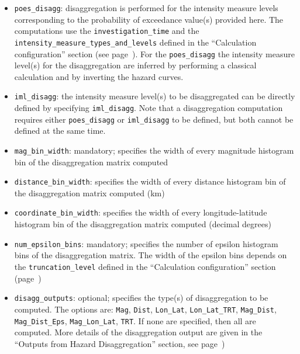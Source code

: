\begin{itemize}

    \item \Verb+poes_disagg+: disaggregation is performed for the intensity
    measure levels corresponding to the probability of exceedance value(s) provided
    here. The computations use the \texttt{investigation\_time} and the
    \texttt{intensity\_measure\_types\_and\_levels} defined in the
    ``Calculation configuration'' section   (see page~\pageref{sec:calculation_configuration}).
    For the \texttt{poes\_disagg} the intensity measure level(s) for the disaggregation are
    inferred by performing a classical calculation and by inverting the hazard curves.

    \item \Verb+iml_disagg+: the intensity measure level(s) to be disaggregated can be directly defined
    by specifying \texttt{iml\_disagg}. Note that a
    disaggregation computation requires either \texttt{poes\_disagg} or
    \texttt{iml\_disagg} to be defined, but both cannot be defined at the same time.

    \item \Verb+mag_bin_width+: mandatory; specifies the width of every magnitude
     histogram bin of the disaggregation matrix computed

    \item \Verb+distance_bin_width+: specifies the width of every distance
    histogram bin of the disaggregation matrix computed (km)

    \item \Verb+coordinate_bin_width+: specifies the width of every longitude-latitude
    histogram bin of the disaggregation matrix computed (decimal degrees)

    \item \Verb+num_epsilon_bins+: mandatory; specifies the number of epsilon
    histogram bins of the disaggregation matrix. The width of the epsilon bins
    depends on the \texttt{truncation\_level} defined in the
    ``Calculation configuration'' section (page~\pageref{sec:calculation_configuration})

    \item \Verb+disagg_outputs+: optional; specifies the type(s) of disaggregation
    to be computed. The options are: \texttt{Mag}, \texttt{Dist}, \texttt{Lon\_Lat},
    \texttt{Lon\_Lat\_TRT}, \texttt{Mag\_Dist}, \texttt{Mag\_Dist\_Eps},
    \texttt{Mag\_Lon\_Lat}, \texttt{TRT}. If none are specified, then all are
    computed. More details of the disaggregation output are given in the
    ``Outputs from Hazard Disaggregation'' section,
    see page~\pageref{subsec:output_hazard_disaggregation})


\end{itemize}
